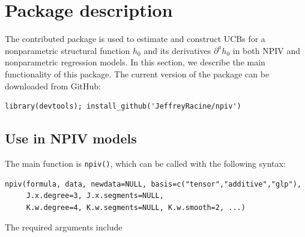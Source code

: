 \documentclass[
]{jss}
\begin{document}
\section{Package description}\label{desc}

The contributed  package  is used to estimate and
construct UCBs for a nonparametric structural function \(h_0\) and its
derivatives \(\partial^a h_0\) in both NPIV and nonparametric regression
models. In this section, we describe the main functionality of this
package. The current version of the package can be downloaded from
GitHub:

\begin{verbatim}
library(devtools); install_github('JeffreyRacine/npiv')
\end{verbatim}

\subsection{Use in NPIV models}\label{use-in-npiv-models}

The main function is \texttt{npiv()}, which can be called with the
following syntax:

\begin{verbatim}
npiv(formula, data, newdata=NULL, basis=c("tensor","additive","glp"),
     J.x.degree=3, J.x.segments=NULL, 
     K.w.degree=4, K.w.segments=NULL, K.w.smooth=2, ...)
\end{verbatim}

The required arguments include
\end{document}

